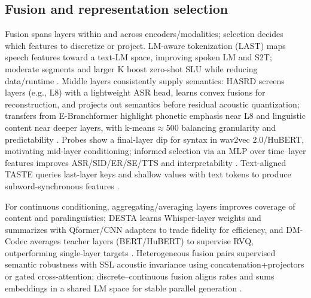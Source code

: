 \documentclass{article}
\begin{document}
\subsection{Fusion and representation selection} \label{subsec:fusionandrepresentationselection}
Fusion spans layers within and across encoders/modalities; selection decides which features to discretize or project. LM-aware tokenization (LAST) maps speech features toward a text-LM space, improving spoken LM and S2T; moderate segments and larger K boost zero-shot SLU while reducing data/runtime \cite{turetzky2024lastlanguagemodelawarespeechtokenization,kando2025exploringeffectsegmentationvocabularysiz}. Middle layers consistently supply semantics: HASRD screens layers (e.g., L8) with a lightweight ASR head, learns convex fusions for reconstruction, and projects out semantics before residual acoustic quantization; transfers from E-Branchformer highlight phonetic emphasis near L8 and linguistic content near deeper layers, with k-means$\approx$500 balancing granularity and predictability \cite{hussein2025hasrdhierarchicalacousticsemanticreprese,chen2023reducingbarriersselfsupervisedlearninghu}. Probes show a final-layer dip for syntax in wav2vec 2.0/HuBERT, motivating mid-layer conditioning; informed selection via an MLP over time--layer features improves ASR/SID/ER/SE/TTS and interpretability \cite{shen2023wavesyntaxprobingspokenlanguagemodels,mousavi2024howshouldweextractdiscreteaudiotokenssel}. Text-aligned TASTE queries last-layer keys and shallow values with text tokens to produce subword-synchronous features \cite{tseng2025tastetextalignedspeechtokenizationembedd}.

For continuous conditioning, aggregating/averaging layers improves coverage of content and paralinguistics; DESTA learns Whisper-layer weights and summarizes with Qformer/CNN adapters to trade fidelity for efficiency, and DM-Codec averages teacher layers (BERT/HuBERT) to supervise RVQ, outperforming single-layer targets \cite{lu2024destaenhancingspeechlanguagemodelsthroug,ahasan2025dmcodecdistillingmultimodalrepresentatio}. Heterogeneous fusion pairs supervised semantic robustness with SSL acoustic invariance using concatenation+projectors or gated cross-attention; discrete--continuous fusion aligns rates and sums embeddings in a shared LM space for stable parallel generation \cite{mei2025shnumultilingualconversationalspeechreco,lin2025dkusystemmultispeakerautomaticspeechreco,tan2025drvoiceparallelspeechtextvoiceconversati}.
\end{document}
